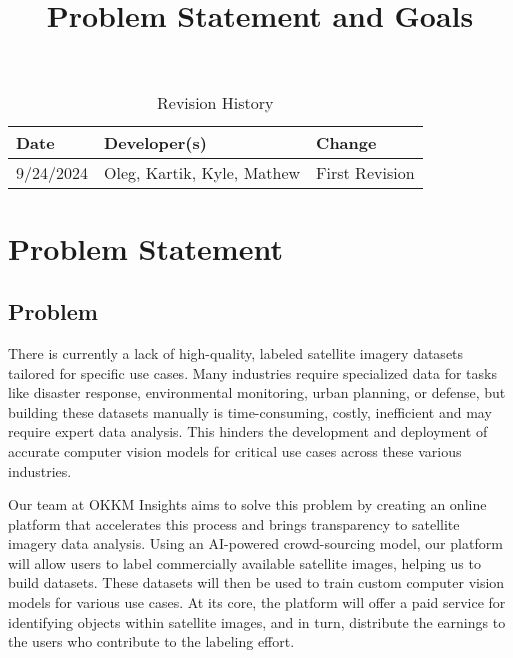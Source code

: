 \documentclass{article}
\title{Problem Statement and Goals\\\progname}
\author{\authname}
\date{}
\begin{document}
\maketitle

\begin{table}[hp]
\caption{Revision History} \label{TblRevisionHistory}
\begin{tabularx}{\textwidth}{llX}
\toprule
\textbf{Date} & \textbf{Developer(s)} & \textbf{Change}\\
\midrule
9/24/2024 & Oleg, Kartik, Kyle, Mathew & First Revision\\

\bottomrule
\end{tabularx}
\end{table}

\section{Problem Statement}



\subsection{Problem}
There is currently a lack of high-quality, labeled satellite imagery datasets tailored for specific use cases. Many industries require specialized data for tasks like disaster 
response, environmental monitoring, urban planning, or defense, but building these datasets manually is time-consuming, costly, inefficient and may require expert data analysis. 
This hinders the development and deployment of accurate computer vision models for critical use cases across these various industries.

Our team at OKKM Insights aims to solve this problem by creating an online platform that accelerates this process and brings transparency to satellite imagery data analysis. 
Using an AI-powered crowd-sourcing model, our platform will allow users to label commercially available satellite images, helping us to build datasets. These datasets will then 
be used to train custom computer vision models for various use cases. At its core, the platform will offer a paid service for identifying objects within satellite images, 
and in turn, distribute the earnings to the users who contribute to the labeling effort.
\end{document}
